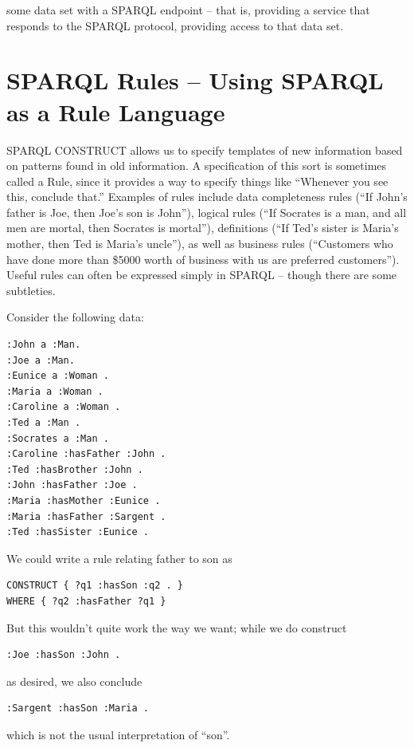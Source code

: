 some data set with a SPARQL endpoint -- that is, providing a service
that responds to the SPARQL 
protocol, providing access to that data set.

\section{SPARQL Rules -- Using SPARQL as a Rule Language}

SPARQL CONSTRUCT allows us to specify templates of new information based
on patterns found in old information. A specification of this sort is
sometimes called a Rule, since it provides a way to specify things like
``Whenever you see this, conclude that.'' Examples of rules include data
completeness rules (``If John's father is Joe, then Joe's son is
John''), logical rules (``If Socrates is a man, and all men are mortal,
then Socrates is mortal''), definitions (``If Ted's sister is Maria's
mother, then Ted is Maria's uncle''), as well as business rules
(``Customers who have done more than \$5000
worth of business with us are preferred customers''). Useful rules can
often be expressed simply in 
SPARQL -- though there are some subtleties.

Consider the following data:

\begin{lstlisting}
:John a :Man.
:Joe a :Man.
:Eunice a :Woman .
:Maria a :Woman .
:Caroline a :Woman .
:Ted a :Man .
:Socrates a :Man .
:Caroline :hasFather :John .
:Ted :hasBrother :John .
:John :hasFather :Joe .
:Maria :hasMother :Eunice .
:Maria :hasFather :Sargent .
:Ted :hasSister :Eunice .
\end{lstlisting}

We could write a rule relating father to son as

\begin{lstlisting}
CONSTRUCT { ?q1 :hasSon :q2 . }
WHERE { ?q2 :hasFather ?q1 }
\end{lstlisting}

But this wouldn't quite work the way we want; while we do construct


\begin{lstlisting}
:Joe :hasSon :John .
\end{lstlisting}

as desired, we also conclude

\begin{lstlisting}
:Sargent :hasSon :Maria .
\end{lstlisting}

which is not the usual interpretation of ``son''.


